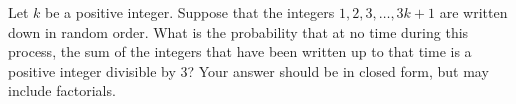 Let $k$ be a positive integer. Suppose that the integers $1, 2, 3,
\dots, 3k+1$ are written down in random order. What is the probability
that at no time during this process, the sum of the integers that have
been written up to that time is a positive integer divisible by 3? Your
answer should be in closed form, but may include factorials.
